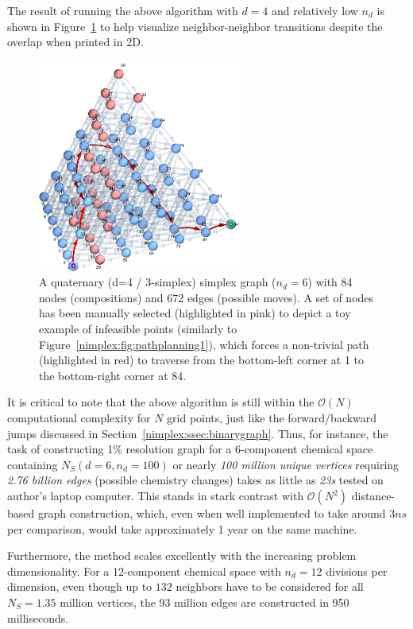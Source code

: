 The result of running the above algorithm with $d=4$ and relatively low $n_d$ is shown in Figure~\ref{nimplex:fig:quaternarysimplexgraph} to help visualize neighbor-neighbor transitions despite the overlap when printed in 2D.

\begin{figure}[h]
    \centering
    \includegraphics[width=0.6\textwidth]{nimplex/SimplexGraphQuaternaryAnnotated.png}
    \caption{A quaternary (d=4 / 3-simplex) simplex graph ($n_d=6$) with 84 nodes (compositions) and 672 edges (possible moves). A set of nodes has been manually selected (highlighted in pink) to depict a toy example of infeasible points (similarly to Figure~\ref{nimplex:fig:pathplanning1}), which forces a non-trivial path (highlighted in red) to traverse from the bottom-left corner at 1 to the bottom-right corner at 84.} 
    \label{nimplex:fig:quaternarysimplexgraph}
\end{figure}

It is critical to note that the above algorithm is still within the $\mathcal{O}(N)$ computational complexity for $N$ grid points, just like the forward/backward jumps discussed in Section~\ref{nimplex:ssec:binarygraph}. Thus, for instance, the task of constructing 1\% resolution graph for a 6-component chemical space containing $N_S(d=6, n_d=100)$ or nearly \textit{100 million unique vertices} requiring \textit{2.76 billion edges} (possible chemistry changes) takes as little as \textit{23s} tested on author's laptop computer. This stands in stark contrast with $\mathcal{O}(N^2)$ distance-based graph construction, which, even when well implemented to take around $3ns$ per comparison, would take approximately 1 year on the same machine.

Furthermore, the method scales excellently with the increasing problem dimensionality. For a 12-component chemical space with $n_d=12$ divisions per dimension, even though up to $132$ neighbors have to be considered for all $N_S=1.35$ million vertices, the 93 million edges are constructed in 950 milliseconds.


